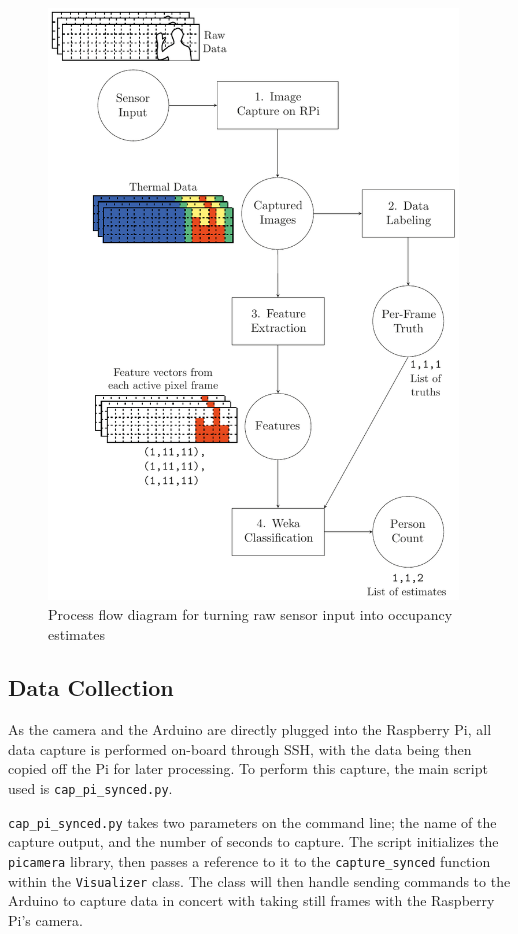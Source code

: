\documentclass[../thesis/thesis.tex]{subfiles}
\begin{document}
\begin{figure}
\centering
\includegraphics[width=0.97\textwidth]{../diagrams/process-pics.pdf}
\caption{Process flow diagram for turning raw sensor input into occupancy estimates}
\label{fig:methods:flowchart}
\end{figure}

\subsection{Data Collection}
As the camera and the Arduino are directly plugged into the Raspberry Pi, all data capture is performed on-board through SSH, with the data being then copied off the Pi for later processing. To perform this capture, the main script used is \texttt{cap\_pi\_synced.py}.

\texttt{cap\_pi\_synced.py} takes two parameters on the command line; the name of the capture output, and the number of seconds to capture. The script initializes the \texttt{picamera} library, then passes a reference to it to the \texttt{capture\_synced} function within the \texttt{Visualizer} class. The class will then handle sending commands to the Arduino to capture data in concert with taking still frames with the Raspberry Pi's camera.
\end{document}

